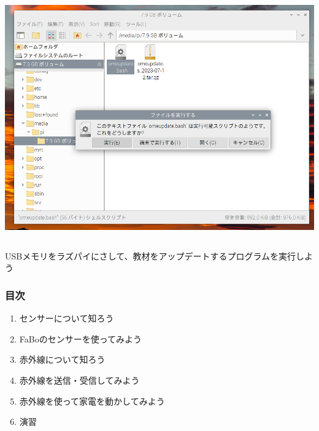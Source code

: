 \begin{frame}[fragile]
\begin{center}
\begin{columns}
\begin{column}{0.48\textwidth}
                \includegraphics[width=\textwidth]{images/slide/exe_volume.png}
            \end{column}
        \end{columns}
        {USBメモリをラズパイにさして、教材をアップデートするプログラムを実行しよう}
    \end{center}
\end{frame}

\begin{frame}[fragile]
    \frametitle{目次}
    \begin{enumerate}
        \item センサーについて知ろう
        \item FaBoのセンサーを使ってみよう
        \item 赤外線について知ろう
        \item 赤外線を送信・受信してみよう
        \item 赤外線を使って家電を動かしてみよう
        \item 演習
    \end{enumerate}
\end{frame}
